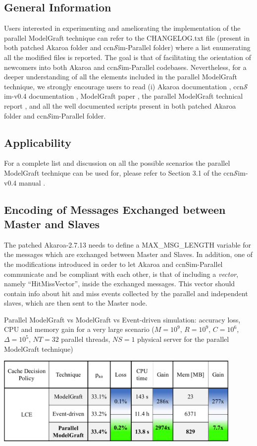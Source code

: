 \documentclass[10pt]{article}
\newcommand{\ccnsim}{ccn\ensuremath{\mathcal{S}}im} %
\begin{document}
\subsection*{General Information} 
Users interested in experimenting and ameliorating the implementation of the parallel ModelGraft technique can refer to the CHANGELOG.txt file (present in both patched Akaroa folder and \ccnsim-Parallel folder) where a list enumerating all the modified files is reported. The goal is that of facilitating the orientation of newcomers into both Akaroa and \ccnsim-Parallel codebases. 
Nevertheless, for a deeper understanding of all the elements included in the parallel ModelGraft technique, we strongly encourage users to read (i) Akaroa documentation \cite{AkaroaPrj}, \ccnsim-v0.4 documentation \cite{ccnSim}, ModelGraft paper \cite{tortelli-comnet:17}, the parallel ModelGraft technical report \cite{pMG_techRep}, and all the well documented scripts present in both patched Akaroa folder and \ccnsim-Parallel folder.

\subsection*{Applicability}
For a complete list and discussion on all the possible scenarios the parallel ModelGraft technique can be used for, please refer to Section 3.1 of the \ccnsim-v0.4 manual \cite{ccnSim}.  

\subsection*{Encoding of Messages Exchanged between Master and Slaves}
The patched Akaroa-2.7.13 needs to define a MAX\_MSG\_LENGTH variable for the messages which are exchanged between Master and Slaves. 
In addition, one of the modifications introduced in order to let Akaroa and ccnSim-Parallel communicate and be compliant with each other, is that of including a \emph{vector}, namely ``HitMissVector'', inside the exchanged messages. This vector should contain info about hit and miss events collected by the parallel and independent slaves, which are then sent to the Master node. 

\begin{table}[t] 
  \centering
  \caption{Parallel ModelGraft vs ModelGraft vs Event-driven simulation: accuracy loss, CPU and memory gain for a very large scenario ($M=10^{9}$, $R=10^{9}$, $C=10^6$, $\Delta=10^5$, $NT=32$ parallel threads, $NS=1$ physical server for the parallel ModelGraft technique)}\label{tab:table_1e9}
    \includegraphics[width=0.9\textwidth]{table_1e9.pdf}
\end{table} 
\end{document}
